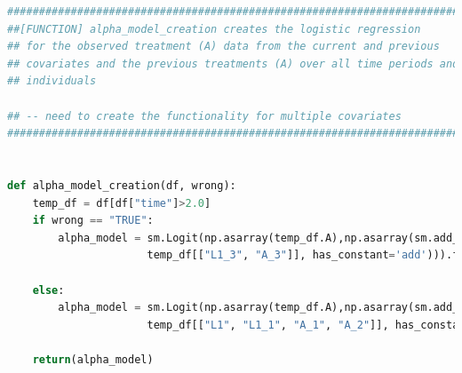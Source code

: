 \begin{lstlisting}[language=Python]
#########################################################################
##[FUNCTION] alpha_model_creation creates the logistic regression 
## for the observed treatment (A) data from the current and previous 
## covariates and the previous treatments (A) over all time periods and
## individuals 

## -- need to create the functionality for multiple covariates
#########################################################################


def alpha_model_creation(df, wrong): 
    temp_df = df[df["time"]>2.0]
    if wrong == "TRUE":
        alpha_model = sm.Logit(np.asarray(temp_df.A),np.asarray(sm.add_constant(\
                      temp_df[["L1_3", "A_3"]], has_constant='add'))).fit()

    else: 
        alpha_model = sm.Logit(np.asarray(temp_df.A),np.asarray(sm.add_constant(\
                      temp_df[["L1", "L1_1", "A_1", "A_2"]], has_constant='add'))).fit()

    return(alpha_model)  
\end{lstlisting}

